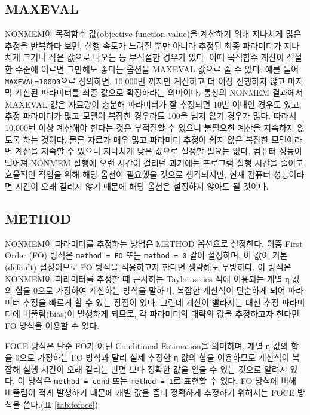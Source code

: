 \documentclass[
  10pt,
]{krantz}
\begin{document}
\hypertarget{maxeval}{%
\subsection{MAXEVAL}\label{maxeval}}

NONMEM이 목적함수 값(objective function value)을 계산하기 위해 지나치게 많은 추정을 반복하다 보면, 실행 속도가 느려질 뿐만 아니라 추정된 최종 파라미터가 지나치게 크거나 작은 값으로 나오는 등 부적절한 경우가 있다. 이때 목적함수 계산이 적절한 수준에 이르면 그만해도 좋다는 옵션을 MAXEVAL 값으로 줄 수 있다. 예를 들어 \texttt{MAXEVAL=10000}으로 정의하면, 10,000번 까지만 계산하고 더 이상 진행하지 않고 마지막 계산된 파라미터를 최종 값으로 확정하라는 의미이다. 통상의 NONMEM 결과에서 MAXEVAL 값은 자료량이 충분해 파라미터가 잘 추정되면 10번 이내인 경우도 있고, 추정 파라미터가 많고 모델이 복잡한 경우라도 100을 넘지 않기 경우가 많다. 따라서 10,000번 이상 계산해야 한다는 것은 부적절할 수 있으니 불필요한 계산을 지속하지 않도록 하는 것이다. 물론 자료가 매우 많고 파라미터 추정이 쉽지 않은 복잡한 모델이라면 계산을 지속할 수 있으니 지나치게 낮은 값으로 설정할 필요는 없다. 컴퓨터 성능이 떨어져 NONMEM 실행에 오랜 시간이 걸리던 과거에는 프로그램 실행 시간을 줄이고 효율적인 작업을 위해 해당 옵션이 필요했을 것으로 생각되지만, 현재 컴퓨터 성능이라면 시간이 오래 걸리지 않기 때문에 해당 옵션은 설정하지 않아도 될 것이다.

\hypertarget{method}{%
\subsection{METHOD}\label{method}}

NONMEM이 파라미터를 추정하는 방법은 METHOD 옵션으로 설정한다. 이중 First Order (FO) 방식은 \texttt{method\ =\ FO} 또는 \texttt{method\ =\ 0} 같이 설정하며, 이 값이 기본(default) 설정이므로 FO 방식을 적용하고자 한다면 생략해도 무방하다. 이 방식은 NONMEM이 파라미터를 추정할 때 근사하는 Taylor series 식에 이용되는 개별 η 값의 합을 0으로 가정하여 계산하는 방식을 말하며, 복잡한 계산식이 단순하게 되어 파라미터 추정을 빠르게 할 수 있는 장점이 있다. 그런데 계산이 빨라지는 대신 추정 파라미터에 비뚤림(bias)이 발생하게 되므로, 각 파라미터의 대략의 값을 추정하고자 한다면 FO 방식을 이용할 수 있다.


FOCE 방식은 단순 FO가 아닌 Conditional Estimation을 의미하며, 개별 η 값의 합을 0으로 가정하는 FO 방식과 달리 실제 추정한 η 값의 합을 이용하므로 계산식이 복잡해 실행 시간이 오래 걸리는 반면 보다 정확한 값을 얻을 수 있는 것으로 알려져 있다. 이 방식은 \texttt{method\ =\ cond} 또는 \texttt{method\ =\ 1}로 표현할 수 있다. FO 방식에 비해 비뚤림이 적게 발생하기 때문에 개별 값을 좀더 정확하게 추정하기 위해서는 FOCE 방식을 쓴다.(표 \ref{tab:fofoce})
\end{document}
